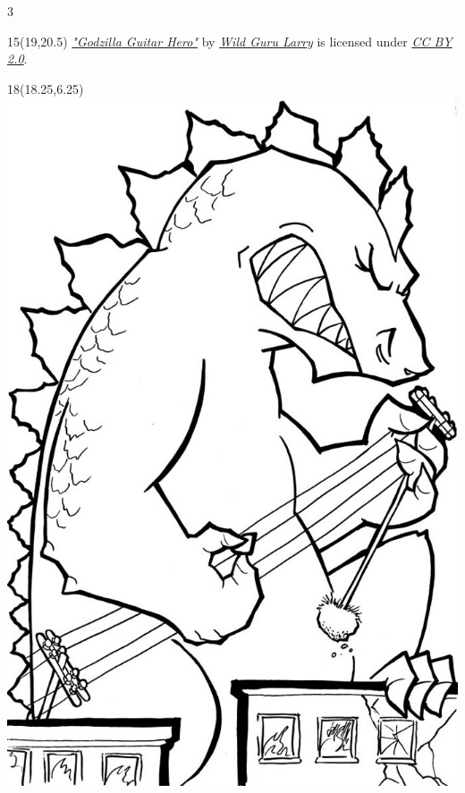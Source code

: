 \documentclass[10pt,oneside,letterpaper,landscape]{memoir}
\newlength{\currentparskip}
\newenvironment{mpage}[1]{%
        \setlength{\currentparskip}{\parskip}%
             \begin{minipage}{#1}%
         \setlength{\parskip}{\currentparskip}%
    }
{\end{minipage}}
\begin{document}
\begin{multicols}{3}

  \begin{textblock}{15}(19,20.5)
      \footnotesize
      	\textit{\href{https://www.flickr.com/photos/79023099@N00/5506704850}{"Godzilla Guitar Hero"}} by \textit{\href{https://www.flickr.com/photos/79023099@N00}{Wild Guru Larry}} is licensed under \textit{\href{https://creativecommons.org/licenses/by/2.0/?ref=ccsearch&atype=rich}{CC BY 2.0}}.
  \end{textblock}

\begin{textblock}{18}(18.25,6.25)
    \includegraphics[width=.5\textwidth]{images/5506704850_a8cce4bb2c_b.jpg}
\end{textblock}




\begin{mpage}{2.13\columnwidth}


\end{mpage}
\end{multicols}
\end{document}
